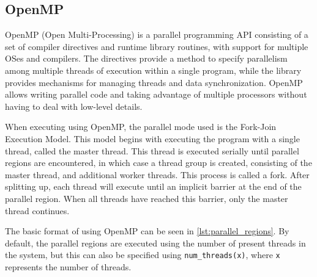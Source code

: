 \subsection{OpenMP}\label{subsec:openmp}

OpenMP (Open Multi-Processing) is a parallel programming API consisting of a set of compiler directives and runtime library routines, with support for multiple OSes and compilers.\cite{openmp} %
The directives provide a method to specify parallelism among multiple threads of execution within a single program, while the library provides mechanisms for managing threads and data synchronization. OpenMP allows writing parallel code and taking advantage of multiple processors without having to deal with low-level details.\cite{openmp}

When executing using OpenMP, the parallel mode used is the Fork-Join Execution Model. This model begins with executing the program with a single thread, called the master thread. This thread is executed serially until parallel regions are encountered, in which case a thread group is created, consisting of the master thread, and additional worker threads. This process is called a fork. After splitting up, each thread will execute until an implicit barrier at the end of the parallel region. When all threads have reached this barrier, only the master thread continues.\cite{openmp}

The basic format of using OpenMP can be seen in \cref{lst:parallel_regions}. By default, the parallel regions are executed using the number of present threads in the system, but this can also be specified using \texttt{num\_threads(x)}, where \texttt{x} represents the number of threads.\cite{openmp}
